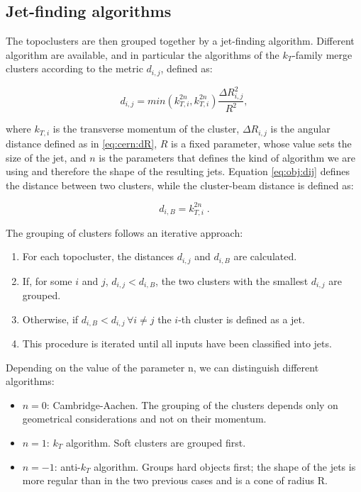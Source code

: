\subsection{Jet-finding algorithms}
\label{sec:obj:jetfinding}

The topoclusters are then grouped together by a jet-finding algorithm. Different algorithm are available, and in particular the algorithms of the $k_T$-family merge clusters according to the metric $d_{i,j}$, defined as:

\begin{equation}
d_{i,j} = min\left( k_{T,i}^{2n}, k_{T,i}^{2n}  \right) \frac{\Delta R_{i,j}^2}{R^2},
\label{eq:obj:dij}
\end{equation}

\noindent where $k_{T,i}$ is the transverse momentum of the cluster, $\Delta R_{i,j}$ is the angular distance defined as in \ref{eq:cern:dR}, 
$R$ is a fixed parameter, whose value sets the size of the jet, and $n$ is the parameters that defines the kind of algorithm we are using 
and therefore the shape of the resulting jets. 
Equation \ref{eq:obj:dij} defines the distance between two clusters, while the cluster-beam distance is defined as:

\begin{equation}
d_{i,B} =  k_{T,i}^{2n} \; .
\end{equation}

The grouping of clusters follows an iterative approach:
\begin{enumerate}
\item For each topocluster, the distances $d_{i,j}$ and $d_{i,B}$ are calculated.
\item If, for some $i$ and $j$, $d_{i,j} < d_{i,B}$, the two clusters with the smallest $d_{i,j}$ are grouped. 
\item Otherwise, if $d_{i,B} < d_{i,j} \, \forall i \neq j $ the $i$-th cluster is defined as a jet.
\item This procedure is iterated until all inputs have been classified into jets.
\end{enumerate}

\noindent Depending on the value of the parameter n, we can distinguish different algorithms:
\begin{itemize}
\item $n=0$: Cambridge-Aachen. The grouping of the clusters depends only on geometrical considerations and not on their momentum. 
\item $n=1$: $k_T$ algorithm. Soft clusters are grouped first.
\item $n=-1$: anti-$k_T$ algorithm. Groups hard objects first; the shape of the jets is more regular than in the two previous cases and is a cone of radius R.
\end{itemize}

